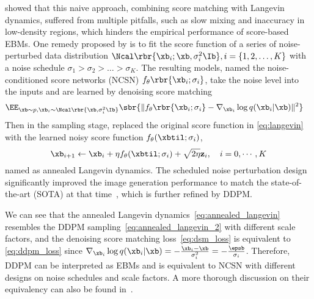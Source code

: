 \citet{song2019generative} showed that this naive approach, combining score matching with Langevin dynamics, suffered from multiple pitfalls, such as slow mixing and inaccuracy in low-density regions, which hinders the empirical performance of score-based EBMs. One remedy proposed by \citet{song2019generative} is to fit the score function of a series of noise-perturbed data distribution $\Ncal\rbr{\xb_i;\xb, \sigma_i^2 \Ib}, i=\{1,2,\dots, K\}$ with a noise schedule $\sigma_1> \sigma_2>\dots>\sigma_K$. 
The resulting models, named the noise-conditioned score networks (NCSN) $f_\theta\rbr{\xb_i;\sigma_i}$, take the noise level into the inputs and are learned by denoising score matching~\cite{vincent2011connection}
\begin{align}
    &\EE_{\xb\sim p,\xb_i\sim\Ncal\rbr{\xb,\sigma_i^2 \Ib}}\sbr{\|f_\theta\rbr{\xb_i;\sigma_i} -\nabla_{\xb_i}\log q(\xb_i|\xb) \|^2}\label{eq:dsm_loss}
\end{align}
Then in the sampling stage, \citet{song2019generative} replaced the original score function in \eqref{eq:langevin} with the learned noisy score function $f_\theta(\xbtil;\sigma_i)$,
\begin{equation}
    \xb_{i+1} \leftarrow \xb_i+\eta f_\theta(\xbtil;\sigma_i)+\sqrt{2 \eta} \mathbf{z}_i, \quad i=0,\cdots, K\label{eq:annealed_langevin}
\end{equation}
named as annealed Langevin dynamics. The scheduled noise perturbation design significantly improved the image generation performance to match the state-of-the-art (SOTA) at that time~\cite{song2019generative}, which is further refined by DDPM.

We can see that the annealed Langevin dynamics~\eqref{eq:annealed_langevin} resembles the DDPM sampling~\eqref{eq:annealed_langevin_2} with different scale factors, and the denoising score matching loss~\eqref{eq:dsm_loss} is equivalent to \eqref{eq:ddpm_loss} since 
$\nabla_{\xb_i}\log q(\xb_i|\xb)=-\frac{\xb_i-\xb}{\sigma_i^2}=-\frac{\epsb}{\sigma_i}$. Therefore, DDPM can be interpreted as EBMs and is equivalent to NCSN with different designs on noise schedules and scale factors. A more thorough discussion on their equivalency can also be found in~\citet{ho2020denoising,song2021scorebased}.










